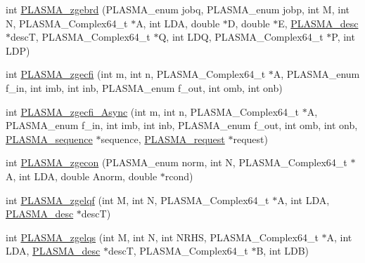 \begin{DoxyCompactItemize}
\item 
int \hyperlink{group__PLASMA__Complex64__t_ga1d3eeb613fb6212be5c52cbde1dbf8d3_ga1d3eeb613fb6212be5c52cbde1dbf8d3}{P\+L\+A\+S\+M\+A\+\_\+zgebrd} (P\+L\+A\+S\+M\+A\+\_\+enum jobq, P\+L\+A\+S\+M\+A\+\_\+enum jobp, int M, int N, P\+L\+A\+S\+M\+A\+\_\+\+Complex64\+\_\+t $\ast$A, int L\+D\+A, double $\ast$D, double $\ast$E, \hyperlink{structplasma__desc__t}{P\+L\+A\+S\+M\+A\+\_\+desc} $\ast$desc\+T, P\+L\+A\+S\+M\+A\+\_\+\+Complex64\+\_\+t $\ast$Q, int L\+D\+Q, P\+L\+A\+S\+M\+A\+\_\+\+Complex64\+\_\+t $\ast$P, int L\+D\+P)
\item 
int \hyperlink{group__PLASMA__Complex64__t_gad4bd072d232eb6234337351c6bf4a4db_gad4bd072d232eb6234337351c6bf4a4db}{P\+L\+A\+S\+M\+A\+\_\+zgecfi} (int m, int n, P\+L\+A\+S\+M\+A\+\_\+\+Complex64\+\_\+t $\ast$A, P\+L\+A\+S\+M\+A\+\_\+enum f\+\_\+in, int imb, int inb, P\+L\+A\+S\+M\+A\+\_\+enum f\+\_\+out, int omb, int onb)
\item 
int \hyperlink{group__PLASMA__Complex64__t_ga9bcca5fcd75e894805f9b8533f67e6d3_ga9bcca5fcd75e894805f9b8533f67e6d3}{P\+L\+A\+S\+M\+A\+\_\+zgecfi\+\_\+\+Async} (int m, int n, P\+L\+A\+S\+M\+A\+\_\+\+Complex64\+\_\+t $\ast$A, P\+L\+A\+S\+M\+A\+\_\+enum f\+\_\+in, int imb, int inb, P\+L\+A\+S\+M\+A\+\_\+enum f\+\_\+out, int omb, int onb, \hyperlink{structplasma__sequence__t}{P\+L\+A\+S\+M\+A\+\_\+sequence} $\ast$sequence, \hyperlink{structplasma__request__t}{P\+L\+A\+S\+M\+A\+\_\+request} $\ast$request)
\item 
int \hyperlink{group__PLASMA__Complex64__t_gace89692c6f34773c9daad5f35610e95b_gace89692c6f34773c9daad5f35610e95b}{P\+L\+A\+S\+M\+A\+\_\+zgecon} (P\+L\+A\+S\+M\+A\+\_\+enum norm, int N, P\+L\+A\+S\+M\+A\+\_\+\+Complex64\+\_\+t $\ast$A, int L\+D\+A, double Anorm, double $\ast$rcond)
\item 
int \hyperlink{group__PLASMA__Complex64__t_ga8990facf0cb04df2a107c02e5dd5f3f7_ga8990facf0cb04df2a107c02e5dd5f3f7}{P\+L\+A\+S\+M\+A\+\_\+zgelqf} (int M, int N, P\+L\+A\+S\+M\+A\+\_\+\+Complex64\+\_\+t $\ast$A, int L\+D\+A, \hyperlink{structplasma__desc__t}{P\+L\+A\+S\+M\+A\+\_\+desc} $\ast$desc\+T)
\item 
int \hyperlink{group__PLASMA__Complex64__t_ga8e8b7d834eb0ad99766799bcfa48d4b1_ga8e8b7d834eb0ad99766799bcfa48d4b1}{P\+L\+A\+S\+M\+A\+\_\+zgelqs} (int M, int N, int N\+R\+H\+S, P\+L\+A\+S\+M\+A\+\_\+\+Complex64\+\_\+t $\ast$A, int L\+D\+A, \hyperlink{structplasma__desc__t}{P\+L\+A\+S\+M\+A\+\_\+desc} $\ast$desc\+T, P\+L\+A\+S\+M\+A\+\_\+\+Complex64\+\_\+t $\ast$B, int L\+D\+B)
\item 

\end{DoxyCompactItemize}
